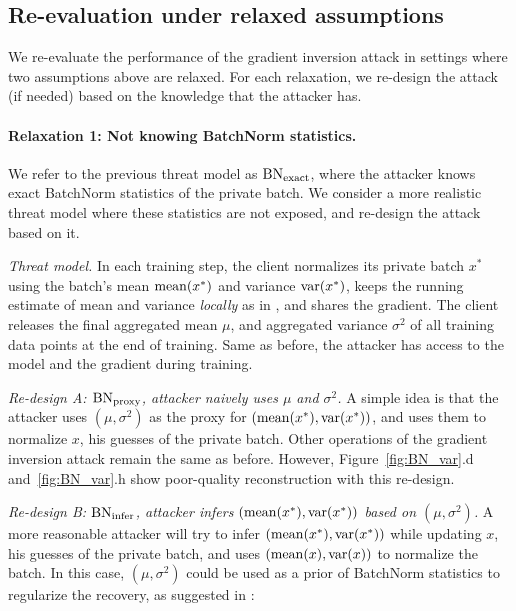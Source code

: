 \subsection{Re-evaluation under relaxed assumptions} 
\label{sec:assumption_invalidate}

We re-evaluate the performance of the gradient inversion attack in settings where two assumptions above are relaxed. For each relaxation, we re-design the attack (if needed) based on the knowledge that the attacker has. 


\paragraph{Relaxation 1: Not knowing BatchNorm statistics.} We refer to the previous threat model as $\rm BN_{exact}$, where the attacker knows exact BatchNorm statistics of the private batch. We consider a more realistic threat model where these statistics are not exposed, and re-design the attack based on it.


\textit{Threat model.} In each training step, the client normalizes its private batch $x^*$ using the batch's mean ${\rm mean}(x^*)$ and variance ${\rm var}(x^*)$, keeps the running estimate of mean and variance \textit{locally} as in \citep{li2021fedbn}, and shares the gradient. The client releases the final aggregated mean $\mu$, and aggregated variance $\sigma^2$ of all training data points at the end of training. Same as before, the attacker has access to the model and the gradient during training. %


\textit{Re-design A: $\rm BN_{proxy}$, attacker naively uses $\mu$ and $\sigma^2$.} A simple idea is that the attacker uses $(\mu, \sigma^2)$ as the proxy for $({\rm mean}(x^*), {\rm var}(x^*))$, and uses them to normalize $x$, his guesses of the private batch. Other operations of the gradient inversion attack remain the same as before. However, Figure~\ref{fig:BN_var}.d and~\ref{fig:BN_var}.h show poor-quality reconstruction with this re-design. 


\textit{Re-design B: $\rm BN_{infer}$, attacker infers $({\rm mean}(x^*), {\rm var}(x^*))$ based on $(\mu, \sigma^2)$.} %
A more reasonable attacker will try to infer $({\rm mean}(x^*), {\rm var}(x^*))$ while updating $x$, his guesses of the private batch, and uses $({\rm mean}(x), {\rm var}(x))$ to normalize the batch. In this case, $(\mu, \sigma^2)$ could be used as a prior of BatchNorm statistics to regularize the recovery, as suggested in \citep{yin2021see}:

